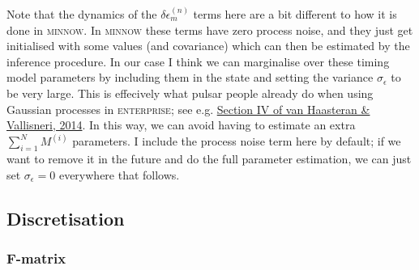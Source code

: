 \documentclass{tufte-handout} %
\begin{document}
\noindent Note that the dynamics of the $\delta \epsilon^{(n)}_{m}$ terms here are a bit different to how it is done in \textsc{minnow}. In \textsc{minnow} these terms have zero process noise, and they just get initialised with some values (and covariance) which can then be estimated by the inference procedure. In our case I think we can marginalise over these timing model parameters by including them in the state and setting the variance $\sigma_\epsilon$ to be very large. This is effecively what pulsar people already do when using Gaussian processes in \textsc{enterprise}; see e.g. \href{https://arxiv.org/abs/1407.1838}{Section IV of van Haasteran \& Vallisneri, 2014}. In this way, we can avoid having to estimate an extra $\sum_{i=1}^{N} M^{(i)}$ parameters. I include the process noise term here by default; if we want to remove it in the future and do the full parameter estimation, we can just set $\sigma_\epsilon=0$ everywhere that follows.




\subsection{Discretisation}

\subsubsection{F-matrix}
	
\end{document}
